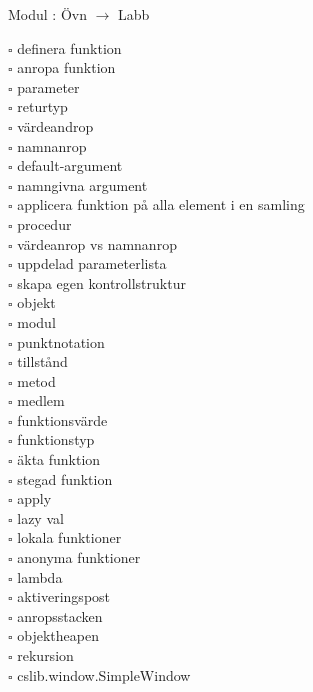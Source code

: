 
Modul : Övn  $\rightarrow$ Labb 
\begin{multicols}{3}\SlideFontTiny
$\square$ definera funktion \\
$\square$ anropa funktion \\
$\square$ parameter \\
$\square$ returtyp \\
$\square$ värdeandrop \\
$\square$ namnanrop \\
$\square$ default-argument \\
$\square$ namngivna argument \\
$\square$ applicera funktion på alla element i en samling \\
$\square$ procedur \\
$\square$ värdeanrop vs namnanrop \\
$\square$ uppdelad parameterlista \\
$\square$ skapa egen kontrollstruktur \\
$\square$ objekt \\
$\square$ modul \\
$\square$ punktnotation \\
$\square$ tillstånd \\
$\square$ metod \\
$\square$ medlem \\
$\square$ funktionsvärde \\
$\square$ funktionstyp \\
$\square$ äkta funktion \\
$\square$ stegad funktion \\
$\square$ apply \\
$\square$ lazy val \\
$\square$ lokala funktioner \\
$\square$ anonyma funktioner \\
$\square$ lambda \\
$\square$ aktiveringspost \\
$\square$ anropsstacken \\
$\square$ objektheapen \\
$\square$ rekursion \\
$\square$ cslib.window.SimpleWindow \\     
\end{multicols}
